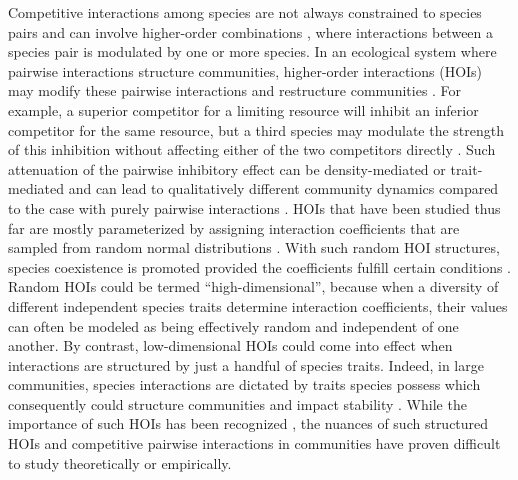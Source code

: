 \documentclass[11pt]{article}
\begin{document}
Competitive interactions among species are not always constrained to species pairs and can involve higher-order combinations \citep{wilson_complex_1992,laird_competitive_2006,grilli_higher-order_2017, mayfield_higher-order_2017}, where interactions between a species pair is modulated by one or more species. In an ecological system where pairwise interactions structure communities, higher-order interactions (HOIs) may modify these pairwise interactions and restructure communities \citep{levine_beyond_2017, singh_higher_2020}. For example, a superior competitor for a limiting resource will inhibit an inferior competitor for the same resource, but a third species may modulate the strength of this inhibition without affecting either of the two competitors directly \citep{bairey_high-order_2016}. Such attenuation of the pairwise inhibitory effect can be density-mediated or trait-mediated and can lead to qualitatively different community dynamics compared to the case with purely pairwise interactions \citep{grilli_higher-order_2017}. HOIs that have been studied thus far are mostly parameterized by assigning interaction coefficients that are sampled from random normal distributions \citep{bairey_high-order_2016, letten_mechanistic_2019}. With such random HOI structures, species coexistence is promoted provided the coefficients fulfill certain conditions \citep{singh_higher_2020}. Random HOIs could be termed ``high-dimensional'', because when a diversity of different independent species traits determine interaction coefficients, their values can often be modeled as being effectively random and independent of one another. By contrast, low-dimensional HOIs could come into effect when interactions are structured by just a handful of species traits. Indeed, in large communities, species interactions are dictated by traits species possess \citep{guimaraes_evolution_2011, maruyama_morphological_2014, mcpeek_evolutionary_2017} which consequently  could structure communities and impact stability \citep{barabas_effect_2016,baruah_impact_2022}. While the importance of such HOIs has been recognized \citep{levine_beyond_2017}, the nuances of such structured HOIs and competitive pairwise interactions in communities have proven difficult to study theoretically or empirically. 
\end{document}
